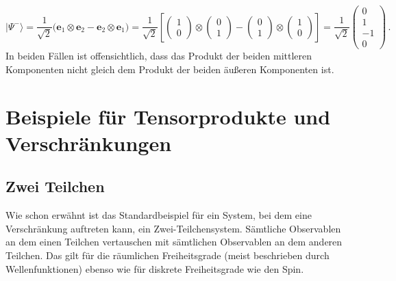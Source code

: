\begin{equation}
       |\Psi^-\rangle = \frac{1}{\sqrt{2}} \big( \pmb{e}_1 \otimes \pmb{e}_2 - \pmb{e}_2 \otimes \pmb{e}_1 \big)
         = \frac{1}{\sqrt{2}} \left[ \left( \begin{array}{c} 1 \\ 0 \end{array} \right)
       \otimes   \left( \begin{array}{c} 0 \\ 1 \end{array} \right) -  \left( \begin{array}{c} 0 \\ 1 \end{array} \right)
       \otimes   \left( \begin{array}{c} 1 \\ 0 \end{array} \right) \right]
       =   \frac{1}{\sqrt{2}} 
        \left( \begin{array}{c} 0 \\ 1 \\ -1 \\ 0 \end{array} \right) \, .
\end{equation}
In beiden F\"allen ist offensichtlich, dass das Produkt der beiden mittleren Komponenten nicht
gleich dem Produkt der beiden \"au\ss eren Komponenten ist. 

\section{Beispiele f\"ur Tensorprodukte und Verschr\"ankungen}

\subsection{Zwei Teilchen}

Wie schon erw\"ahnt ist das Standardbeispiel f\"ur ein System, bei dem eine Verschr\"ankung
auftreten kann, ein Zwei-Teilchensystem. S\"amtliche Observablen an dem einen Teilchen
vertauschen mit s\"amtlichen Observablen an dem anderen Teilchen. Das gilt f\"ur die
r\"aumlichen Freiheitsgrade (meist beschrieben durch Wellenfunktionen) ebenso wie f\"ur diskrete
Freiheitsgrade wie den Spin.

